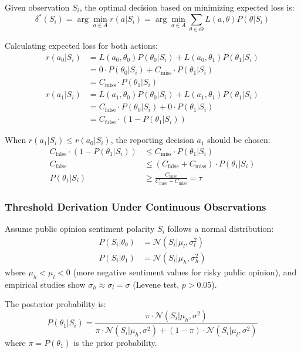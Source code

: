 \documentclass[11pt,a4paper]{report}
\begin{document}
Given observation $S_i$, the optimal decision based on minimizing expected loss is:
\[
\delta^*(S_i) = \arg\min_{a \in A} r(a|S_i) = \arg\min_{a \in A} \sum_{\theta \in \Theta} L(a,\theta) P(\theta|S_i)
\]

Calculating expected loss for both actions:
\[
\begin{aligned}
r(a_0|S_i) &= L(a_0,\theta_0)P(\theta_0|S_i) + L(a_0,\theta_1)P(\theta_1|S_i) \\
&= 0 \cdot P(\theta_0|S_i) + C_{\text{miss}} \cdot P(\theta_1|S_i) \\
&= C_{\text{miss}} \cdot P(\theta_1|S_i) \\
r(a_1|S_i) &= L(a_1,\theta_0)P(\theta_0|S_i) + L(a_1,\theta_1)P(\theta_1|S_i) \\
&= C_{\text{false}} \cdot P(\theta_0|S_i) + 0 \cdot P(\theta_1|S_i) \\
&= C_{\text{false}} \cdot (1 - P(\theta_1|S_i))
\end{aligned}
\]

When $r(a_1|S_i) \leq r(a_0|S_i)$, the reporting decision $a_1$ should be chosen:
\[
\begin{aligned}
C_{\text{false}} \cdot (1 - P(\theta_1|S_i)) &\leq C_{\text{miss}} \cdot P(\theta_1|S_i) \\
C_{\text{false}} &\leq (C_{\text{false}} + C_{\text{miss}}) \cdot P(\theta_1|S_i) \\
P(\theta_1|S_i) &\geq \frac{C_{\text{false}}}{C_{\text{false}} + C_{\text{miss}}} = \tau
\end{aligned}
\]

\subsubsection{Threshold Derivation Under Continuous Observations}

Assume public opinion sentiment polarity $S_i$ follows a normal distribution:
\[
\begin{aligned}
P(S_i|\theta_0) &= \mathcal{N}(S_i|\mu_l, \sigma_l^2) \\
P(S_i|\theta_1) &= \mathcal{N}(S_i|\mu_h, \sigma_h^2)
\end{aligned}
\]
where $\mu_h < \mu_l < 0$ (more negative sentiment values for risky public opinion), and empirical studies show $\sigma_h \approx \sigma_l = \sigma$ (Levene test, $p > 0.05$).

The posterior probability is:
\[
P(\theta_1|S_i) = \frac{\pi \cdot \mathcal{N}(S_i|\mu_h, \sigma^2)}{\pi \cdot \mathcal{N}(S_i|\mu_h, \sigma^2) + (1-\pi) \cdot \mathcal{N}(S_i|\mu_l, \sigma^2)}
\]
where $\pi = P(\theta_1)$ is the prior probability.
\end{document}
